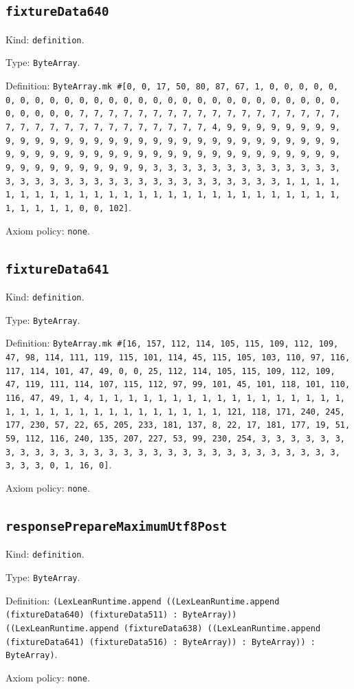 \documentclass[11pt]{article}
\begin{document}
\subsection*{\texttt{fixtureData640}}
\noindent Kind: \texttt{definition}.\par
\noindent Type: \texttt{ByteArray}.\par
\noindent Definition: \texttt{ByteArray.mk \#[0, 0, 17, 50, 80, 87, 67, 1, 0, 0, 0, 0, 0, 0, 0, 0, 0, 0, 0, 0, 0, 0, 0, 0, 0, 0, 0, 0, 0, 0, 0, 0, 0, 0, 0, 0, 0, 0, 0, 0, 0, 7, 7, 7, 7, 7, 7, 7, 7, 7, 7, 7, 7, 7, 7, 7, 7, 7, 7, 7, 7, 7, 7, 7, 7, 7, 7, 7, 7, 7, 7, 7, 7, 4, 9, 9, 9, 9, 9, 9, 9, 9, 9, 9, 9, 9, 9, 9, 9, 9, 9, 9, 9, 9, 9, 9, 9, 9, 9, 9, 9, 9, 9, 9, 9, 9, 9, 9, 9, 9, 9, 9, 9, 9, 9, 9, 9, 9, 9, 9, 9, 9, 9, 9, 9, 9, 9, 9, 9, 9, 9, 9, 9, 9, 9, 9, 9, 9, 3, 3, 3, 3, 3, 3, 3, 3, 3, 3, 3, 3, 3, 3, 3, 3, 3, 3, 3, 3, 3, 3, 3, 3, 3, 3, 3, 3, 3, 3, 3, 3, 1, 1, 1, 1, 1, 1, 1, 1, 1, 1, 1, 1, 1, 1, 1, 1, 1, 1, 1, 1, 1, 1, 1, 1, 1, 1, 1, 1, 1, 1, 1, 1, 0, 0, 102]}.\par
\noindent Axiom policy: \texttt{none}.\par
\subsection*{\texttt{fixtureData641}}
\noindent Kind: \texttt{definition}.\par
\noindent Type: \texttt{ByteArray}.\par
\noindent Definition: \texttt{ByteArray.mk \#[16, 157, 112, 114, 105, 115, 109, 112, 109, 47, 98, 114, 111, 119, 115, 101, 114, 45, 115, 105, 103, 110, 97, 116, 117, 114, 101, 47, 49, 0, 0, 25, 112, 114, 105, 115, 109, 112, 109, 47, 119, 111, 114, 107, 115, 112, 97, 99, 101, 45, 101, 118, 101, 110, 116, 47, 49, 1, 4, 1, 1, 1, 1, 1, 1, 1, 1, 1, 1, 1, 1, 1, 1, 1, 1, 1, 1, 1, 1, 1, 1, 1, 1, 1, 1, 1, 1, 1, 1, 1, 1, 121, 118, 171, 240, 245, 177, 230, 57, 22, 65, 205, 233, 181, 137, 8, 22, 17, 181, 177, 19, 51, 59, 112, 116, 240, 135, 207, 227, 53, 99, 230, 254, 3, 3, 3, 3, 3, 3, 3, 3, 3, 3, 3, 3, 3, 3, 3, 3, 3, 3, 3, 3, 3, 3, 3, 3, 3, 3, 3, 3, 3, 3, 3, 3, 0, 1, 16, 0]}.\par
\noindent Axiom policy: \texttt{none}.\par
\subsection*{\texttt{responsePrepareMaximumUtf8Post}}
\noindent Kind: \texttt{definition}.\par
\noindent Type: \texttt{ByteArray}.\par
\noindent Definition: \texttt{(LexLeanRuntime.append ((LexLeanRuntime.append (fixtureData640) (fixtureData511) : ByteArray)) ((LexLeanRuntime.append (fixtureData638) ((LexLeanRuntime.append (fixtureData641) (fixtureData516) : ByteArray)) : ByteArray)) : ByteArray)}.\par
\noindent Axiom policy: \texttt{none}.\par
\end{document}
